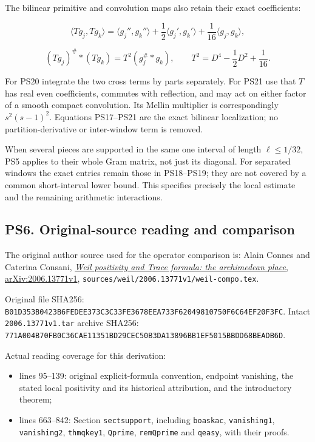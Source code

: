 \documentclass[
  10pt,
  a4paper,
]{article}
\providecommand{\tightlist}{%
  \setlength{\itemsep}{0pt}\setlength{\parskip}{0pt}}
\begin{document}
The bilinear primitive and convolution maps also retain their exact
coefficients:

\[
\langle Tg_j,Tg_k\rangle
=\langle g_j'',g_k''\rangle
+\frac12\langle g_j',g_k'\rangle
+\frac1{16}\langle g_j,g_k\rangle,
\tag{PS20}
\]

\[
(Tg_j)^\#*(Tg_k)
=T^2(g_j^\#*g_k),\qquad
T^2=D^4-\frac12D^2+\frac1{16}.
\tag{PS21}
\]

For PS20 integrate the two cross terms by parts separately. For PS21 use
that \(T\) has real even coefficients, commutes with reflection, and may
act on either factor of a smooth compact convolution. Its Mellin
multiplier is correspondingly \(s^2(s-1)^2\). Equations PS17--PS21 are
the exact bilinear localization; no partition-derivative or inter-window
term is removed.

When several pieces are supported in the same one interval of length
\(\ell\le1/32\), PS5 applies to their whole Gram matrix, not just its
diagonal. For separated windows the exact entries remain those in
PS18--PS19; they are not covered by a common short-interval lower bound.
This specifies precisely the local estimate and the remaining arithmetic
interactions.

\subsection{PS6. Original-source reading and
comparison}\label{ps6.-original-source-reading-and-comparison}

The original author source used for the operator comparison is: Alain
Connes and Caterina Consani,
\href{https://arxiv.org/src/2006.13771v1}{\emph{Weil positivity and
Trace formula: the archimedean place}, arXiv:2006.13771v1},
\texttt{sources/\allowbreak{}weil/\allowbreak{}2006.\allowbreak{}13771v1/\allowbreak{}weil-\allowbreak{}compo.\allowbreak{}tex}.

Original file SHA256:
\texttt{B01D353B\allowbreak{}0423B6FE\allowbreak{}DEE373C3\allowbreak{}C33FE367\allowbreak{}8EEA733F\allowbreak{}62049810\allowbreak{}750F6C64\allowbreak{}EF20F3FC}.
Intact \texttt{2006.\allowbreak{}13771v1.\allowbreak{}tar} archive SHA256:
\texttt{771A004B\allowbreak{}70FB0C36\allowbreak{}CAE11351\allowbreak{}BD29CEC5\allowbreak{}0B3DA138\allowbreak{}96BB1EF5\allowbreak{}015BBDD6\allowbreak{}8BEADB6D}.

Actual reading coverage for this derivation:

\begin{itemize}
\tightlist
\item
  lines 95--139: original explicit-formula convention, endpoint
  vanishing, the stated local positivity and its historical attribution,
  and the introductory theorem;
\item
  lines 663--842: Section \texttt{sectsupport}, including
  \texttt{boaskac}, \texttt{vanishing1}, \texttt{vanishing2},
  \texttt{thmqkey1}, \texttt{Qprime}, \texttt{remQprime} and
  \texttt{qeasy}, with their proofs.
\end{itemize}
\end{document}

